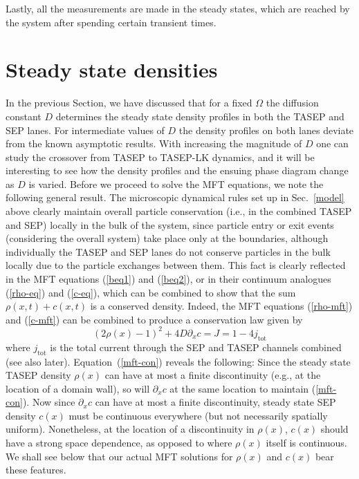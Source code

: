 \documentclass[aps,pre,twocolumn,superscriptaddress,amsmath,amssymb,longbibliography,floatfix]{revtex4}
\begin{document}
 { Lastly, all the measurements are made in the steady states, which are reached by the system after spending certain transient times. 
 
\section{Steady state densities}\label{steady}








In the previous Section, we have discussed  that for a fixed $\Omega$ the diffusion constant $D$ determines the steady state density profiles in both the TASEP and SEP lanes. For intermediate values of  $D$ the density
profiles on both lanes deviate from the known asymptotic results. With increasing the magnitude of $D$ one can study 
the crossover from TASEP to TASEP-LK dynamics, and it will be interesting to 
see how the density profiles and the ensuing phase diagram change as $D$ is varied. Before we proceed to solve the MFT equations, we note the following general result. The microscopic dynamical rules set up in Sec.~\ref{model} above clearly maintain overall particle conservation (i.e., in the combined TASEP and SEP) locally in the bulk of the system, since particle entry or exit events (considering the overall system) take place only at the boundaries, although individually the TASEP and SEP lanes do not conserve particles in the bulk locally due to the particle exchanges between them. This fact is clearly reflected in the MFT equations (\ref{beq1}) and (\ref{beq2}), or in their continuum analogues (\ref{rho-eq}) and (\ref{c-eq}), which can be combined to show that the sum $\rho(x,t)+c(x,t)$ is a conserved density. Indeed, the MFT equations (\ref{rho-mft}) and (\ref{c-mft}) can be combined to produce a conservation law given by
\begin{equation}
 (2\rho(x)-1)^2 + 4D \partial_x c = J=1-4j_\text{tot}\label{mft-con}
\end{equation}
where $j_\text{tot}$ is the total current through the SEP and TASEP channels combined (see also later). Equation~(\ref{mft-con}) reveals the following: Since the steady state TASEP density $\rho(x)$ can have at most a finite discontinuity (e.g., at the location of a domain wall), so will $\partial_x c$ at the same location to maintain (\ref{mft-con}). Now since $\partial_x c$ can have at most a finite discontinuity, steady state SEP density $c(x)$ must be continuous everywhere (but not necessarily spatially uniform). Nonetheless, at the location of a discontinuity in $\rho(x)$, $c(x)$ should have a strong space dependence, as opposed to where $\rho(x)$ itself is continuous. We shall see below that our actual MFT solutions for $\rho(x)$ and $c(x)$ bear these features.  

}
\end{document}
